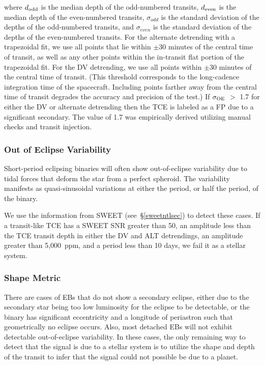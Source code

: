 \noindent where $d_{\rm odd}$ is the median depth of the odd-numbered transits, $d_{\rm even}$ is the median depth of the even-numbered transits, $\sigma_{odd}$ is the standard deviation of the depths of the odd-numbered transits, and $\sigma_{even}$ is the standard deviation of the depths of the even-numbered transits. For the alternate detrending with a trapezoidal fit, we use all points that lie within $\pm$30 minutes of the central time of transit, as well as any other points within the in-transit flat portion of the trapezoidal fit. For the DV detrending, we use all points within $\pm$30 minutes of the central time of transit. (This threshold corresponds to the long-cadence integration time of the \kepler{} spacecraft. Including points farther away from the central time of transit degrades the accuracy and precision of the test.) If $\sigma_{\rm OE}$ $>$ 1.7 for either the DV or alternate detrending then the TCE is labeled as a FP due to a significant secondary. The value of 1.7 was empirically derived utilizing manual checks and transit injection.


\subsubsection{Out of Eclipse Variability}

Short-period eclipsing binaries will often show out-of-eclipse variability due to tidal forces that deform the star from a perfect spheroid. The variability manifests as quasi-sinusoidal variations at either the period, or half the period, of the binary.

We use the information from SWEET (see~\S\ref{sweetntlsec}) to detect these cases. If a transit-like TCE has a SWEET SNR greater than 50, an amplitude less than the TCE transit depth in either the DV and ALT detrendings, an amplitude greater than 5,000~ppm, and a period less than 10 days, we fail it as a stellar system.



\subsubsection{Shape Metric}

There are cases of EBs that do not show a secondary eclipse, either due to the secondary star being too low luminosity for the eclipse to be detectable, or the binary has significant eccentricity and a longitude of periastron such that geometrically no eclipse occurs. Also, most detached EBs will not exhibit detectable out-of-eclipse variability. In these cases, the only remaining way to detect that the signal is due to a stellar system is to utilize the shape and depth of the transit to infer that the signal could not possible be due to a planet.

